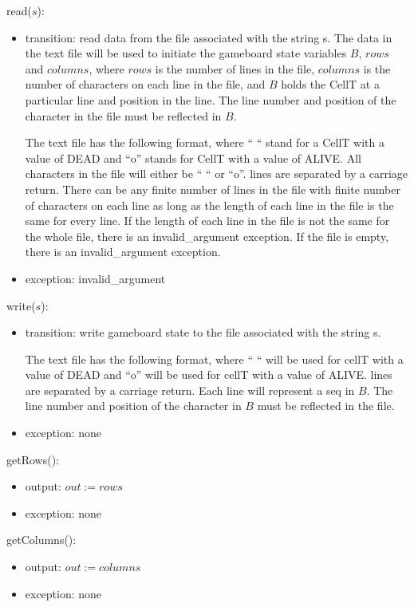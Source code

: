 \documentclass[12pt]{article}
\begin{document}
\noindent read($s$):

\begin{itemize}
\item transition: read data from the file  associated with the string s.
  The data in the text file will be used to initiate the gameboard state variables $B$, $rows$ and $columns$, where $rows$ is the number of lines in the file, $columns$ is the number of characters on each line in the file, and $B$ holds the CellT at a particular line and position in the line. The line number and position of the character in the file must be reflected in $B$. 

  The text file has the following format, where `` `` stand for a CellT with a value of DEAD  and ``o'' stands for CellT with a value of ALIVE. All characters in the file will either be `` `` or  ``o''. lines are separated by a carriage return.  There can be any finite number of lines in the file with finite number of characters on each line as long as the length of each line in the file is the same for every line.  If the length of each line in the file is not the same for the whole file, there is an invalid\_argument exception. If the file is empty, there is an invalid\_argument exception.

\item exception: invalid\_argument
\end{itemize}

\noindent write($s$):

\begin{itemize}
\item transition: write gameboard state to the file  associated with the string s.

  The text file has the following format, where `` `` will be used for cellT with a value of DEAD and ``o'' will be used for cellT with a value of ALIVE. lines are separated by a carriage return. Each line will represent a seq in $B$. The line number and position of the character in $B$ must be reflected in the file.


\item exception: none
\end{itemize}


\noindent getRows():
\begin{itemize}
\item output: $out := rows$
\item exception: none
\end{itemize}

\noindent getColumns():
\begin{itemize}
\item output: $out := columns$
\item exception: none
\end{itemize}
\end{document}
